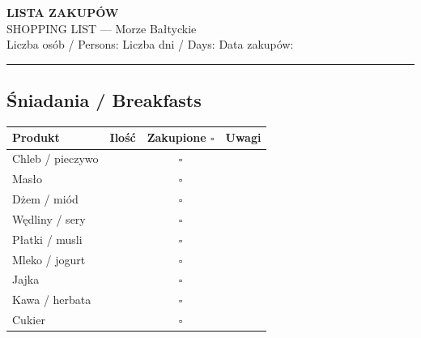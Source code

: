 \documentclass[a4paper,11pt]{article}
\begin{document}

\begin{center}
    {\Large\bfseries\color{pzzblue} LISTA ZAKUPÓW}\\
    {\large SHOPPING LIST — Morze Bałtyckie}\\[4pt]
    {\small Liczba osób / Persons: \field{1.5cm} \quad Liczba dni / Days: \field{1.5cm} \quad Data zakupów: \field{3cm}}
\end{center}

\vspace{0.3cm}
\noindent\rule{\linewidth}{1pt}

\subsection*{Śniadania / Breakfasts}
\begin{tabularx}{\linewidth}{|X|c|c|c|}
\hline
\textbf{Produkt} & \textbf{Ilość} & \textbf{Zakupione \(\square\)} & \textbf{Uwagi} \\
\hline
Chleb / pieczywo & & \(\square\) & \\[4pt]\hline
Masło & & \(\square\) & \\[4pt]\hline
Dżem / miód & & \(\square\) & \\[4pt]\hline
Wędliny / sery & & \(\square\) & \\[4pt]\hline
Płatki / musli & & \(\square\) & \\[4pt]\hline
Mleko / jogurt & & \(\square\) & \\[4pt]\hline
Jajka & & \(\square\) & \\[4pt]\hline
Kawa / herbata & & \(\square\) & \\[4pt]\hline
Cukier & & \(\square\) & \\[4pt]\hline
\end{tabularx}

\vspace{0.3cm}
\end{document}
